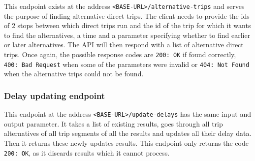 This endpoint exists at the address \texttt{<BASE-URL>/alternative-trips} and serves the purpose of finding alternative direct trips. The client needs to provide the ids of 2 stops between which direct trips run and the id of the trip for which it wants to find the alternatives, a time and a parameter specifying whether to find earlier or later alternatives. The API will then respond with a list of alternative direct trips. Once again, the possible response codes are \texttt{200: OK} if found correctly, \texttt{400: Bad Request} when some of the parameters were invalid or \texttt{404: Not Found} when the alternative trips could not be found.

\subsubsection{Delay updating endpoint}


This endpoint at the address \texttt{<BASE-URL>/update-delays} has the same input and output parameter. It takes a list of existing results, goes through all trip alternatives of all trip segments of all the results and updates all their delay data. Then it returns these newly updates results. This endpoint only returns the code \texttt{200: OK}, as it discards results which it cannot process.